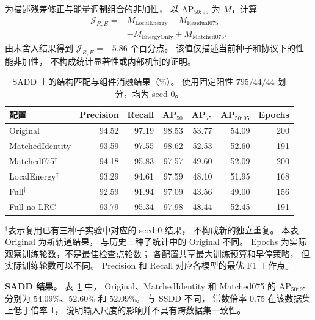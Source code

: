 \documentclass[journal]{IEEEtran}
\begin{document}
为描述残差修正与能量调制组合的非加性，
以 $\mathrm{AP}_{50:95}$ 为 $M$，计算
\begin{equation}
\begin{aligned}
\mathcal{J}_{R,E}
={}&M_{\mathrm{LocalEnergy}}
-M_{\mathrm{Residual075}}\\
&-M_{\mathrm{EnergyOnly}}
+M_{\mathrm{Matched075}}.
\end{aligned}
\label{eq:ablation_interaction_re}
\end{equation}
由未舍入结果得到
$\mathcal{J}_{R,E}=-5.86$ 个百分点。
该值仅描述当前种子和协议下的性能非加性，
不构成统计显著性或内部机制的证明。

\begin{table}[!t]
\centering
\small
\setlength{\tabcolsep}{4pt}
\caption{SADD 上的结构匹配与组件消融结果（\%）。
使用固定阳性 $795/44/44$ 划分，均为 seed 0。}
\label{tab:sadd_matched_components}
\begin{tabular*}{\textwidth}{@{\extracolsep{\fill}}lrrrrrr}
\toprule
配置 & Precision & Recall
& AP$_{50}$ & AP$_{75}$ & AP$_{50:95}$ & Epochs \\
\midrule
Original
& 94.52 & 97.19 & 98.53 & 53.77 & 54.09 & 200 \\
MatchedIdentity
& 93.59 & 97.55 & 98.62 & 52.53 & 52.60 & 191 \\
Matched075$^{\dagger}$
& 94.18 & 95.83 & 97.57 & 49.60 & 52.09 & 200 \\
LocalEnergy$^{\dagger}$
& 93.29 & 94.61 & 97.59 & 48.10 & 51.95 & 168 \\
Full$^{\dagger}$
& 92.59 & 91.94 & 97.09 & 43.56 & 49.00 & 156 \\
\midrule
Full no-LRC
& 93.79 & 95.34 & 97.98 & 48.44 & 52.45 & 191 \\
\bottomrule
\end{tabular*}
\smallskip
\begin{minipage}{\linewidth}
\footnotesize
$^{\dagger}$表示复用已有三种子实验中对应的 seed 0 结果，
不构成新的独立重复。
本表 Original 为新轨道结果，
与历史三种子统计中的 Original 不同。
Epochs 为实际观察训练轮数，不是最佳检查点轮数；
各配置共享最大训练预算和早停策略，
但实际训练轮数可以不同。
Precision 和 Recall 对应各模型的最优 F1 工作点。
\end{minipage}
\end{table}

\textbf{SADD 结果。}
表~\ref{tab:sadd_matched_components} 中，
Original、MatchedIdentity 和 Matched075 的
$\mathrm{AP}_{50:95}$ 分别为
$54.09\%$、$52.60\%$ 和 $52.09\%$。
与 SSDD 不同，
常数倍率 0.75 在该数据集上低于倍率 1，
说明输入尺度的影响并不具有跨数据集一致性。
\end{document}

